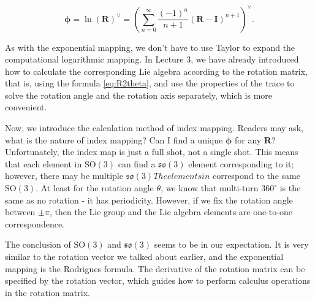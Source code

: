 \begin{equation}
\boldsymbol{\phi} = \ln {\left( \bm{R} \right)^ \vee } = {\left( {\sum\limits_{n = 0}^\infty {\frac{{{{ \left( { - 1} \right)}^n}}}{{n + 1}}{{\left( { \bm{R} - \bm{I}} \right)}^{n + 1 }}} } \right)^ \vee }.
\end{equation}

As with the exponential mapping, we don't have to use Taylor to expand the computational logarithmic mapping. In Lecture 3, we have already introduced how to calculate the corresponding Lie algebra according to the rotation matrix, that is, using the formula \eqref{eq:R2theta}, and use the properties of the trace to solve the rotation angle and the rotation axis separately, which is more convenient.

Now, we introduce the calculation method of index mapping. Readers may ask, what is the nature of index mapping? Can I find a unique $\boldsymbol{\phi}$ for any $\bm{R}$? Unfortunately, the index map is just a full shot, not a single shot. This means that each element in $\mathrm{SO}(3)$ can find a $\mathfrak{so}(3)$ element corresponding to it; however, there may be multiple $\mathfrak{so}( 3) The elements in $ correspond to the same $\mathrm{SO}(3)$. At least for the rotation angle $\theta$, we know that multi-turn $360^\circ$ is the same as no rotation - it has periodicity. However, if we fix the rotation angle between $\pm \pi$, then the Lie group and the Lie algebra elements are one-to-one correspondence.

The conclusion of $\mathrm{SO}(3)$ and $\mathfrak{so}(3)$ seems to be in our expectation. It is very similar to the rotation vector we talked about earlier, and the exponential mapping is the Rodrigues formula. The derivative of the rotation matrix can be specified by the rotation vector, which guides how to perform calculus operations in the rotation matrix.